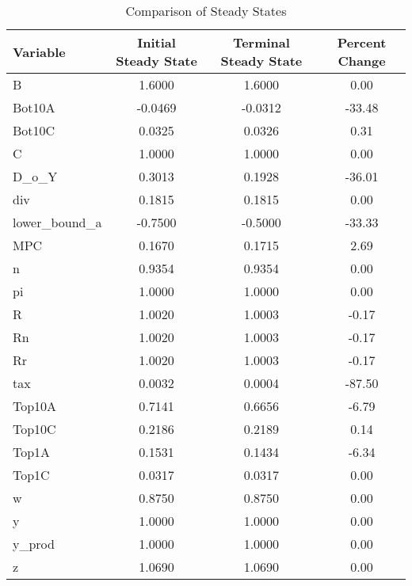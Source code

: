 \documentclass[12pt]{article} %
\numberwithin{equation}{section} %
\begin{document}
\begin{table}
\centering
\caption{Comparison of Steady States}
\label{tab:stst}
\begin{tabular}{lccc}
\hline
     Variable &  Initial Steady State &  Terminal Steady State &  Percent Change \\
\hline
            B &                1.6000 &                 1.6000 &            0.00 \\
       Bot10A &               -0.0469 &                -0.0312 &          -33.48 \\
       Bot10C &                0.0325 &                 0.0326 &            0.31 \\
            C &                1.0000 &                 1.0000 &            0.00 \\
        D\_o\_Y &                0.3013 &                 0.1928 &          -36.01 \\
          div &                0.1815 &                 0.1815 &            0.00 \\
lower\_bound\_a &               -0.7500 &                -0.5000 &          -33.33 \\
          MPC &                0.1670 &                 0.1715 &            2.69 \\
            n &                0.9354 &                 0.9354 &            0.00 \\
           pi &                1.0000 &                 1.0000 &            0.00 \\
            R &                1.0020 &                 1.0003 &           -0.17 \\
           Rn &                1.0020 &                 1.0003 &           -0.17 \\
           Rr &                1.0020 &                 1.0003 &           -0.17 \\
          tax &                0.0032 &                 0.0004 &          -87.50 \\
       Top10A &                0.7141 &                 0.6656 &           -6.79 \\
       Top10C &                0.2186 &                 0.2189 &            0.14 \\
        Top1A &                0.1531 &                 0.1434 &           -6.34 \\
        Top1C &                0.0317 &                 0.0317 &            0.00 \\
            w &                0.8750 &                 0.8750 &            0.00 \\
            y &                1.0000 &                 1.0000 &            0.00 \\
       y\_prod &                1.0000 &                 1.0000 &            0.00 \\
            z &                1.0690 &                 1.0690 &            0.00 \\
\hline
\end{tabular}
\end{table}
\end{document}
